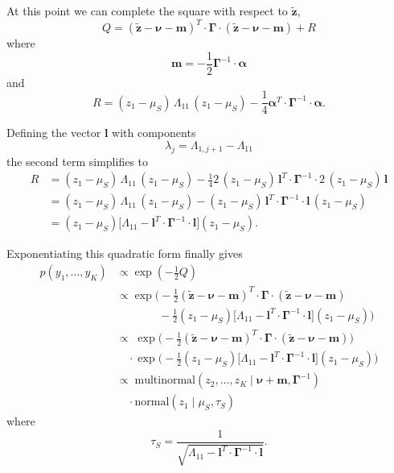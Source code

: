 \documentclass[
  letterpaper,
  DIV=11,
  numbers=noendperiod]{scrartcl}
\begin{document}
At this point we can complete the square with respect to
\(\mathbf{\tilde{z}}\), \[
Q =
(\mathbf{\tilde{z}} - \boldsymbol{\nu} - \mathbf{m})^{T} \cdot
\boldsymbol{\Gamma} \cdot
(\mathbf{\tilde{z}} - \boldsymbol{\nu} - \mathbf{m})
+ R
\] where \[
\mathbf{m} = - \frac{1}{2} \boldsymbol{\Gamma}^{-1} \cdot \boldsymbol{\alpha}
\] and \[
R =
(z_{1} - \mu_{S}) \, \Lambda_{11} \, (z_{1} - \mu_{S})
- \frac{1}{4} \boldsymbol{\alpha}^{T} \cdot
              \boldsymbol{\Gamma}^{-1} \cdot
              \boldsymbol{\alpha}.
\]

Defining the vector \(\mathbf{l}\) with components \[
\lambda_{j} = \Lambda_{1,j+1} - \Lambda_{11}
\] the second term simplifies to \begin{align*}
R
&=
(z_{1} - \mu_{S}) \, \Lambda_{11} \, (z_{1} - \mu_{S})
- \frac{1}{4} 2 \, (z_{1} - \mu_{S}) \, \mathbf{l}^{T} \cdot
  \boldsymbol{\Gamma}^{-1} \cdot
  2 \, (z_{1} - \mu_{S}) \, \mathbf{l}
\\
&=
(z_{1} - \mu_{S}) \, \Lambda_{11} \, (z_{1} - \mu_{S})
- (z_{1} - \mu_{S}) \, \mathbf{l}^{T} \cdot
  \boldsymbol{\Gamma}^{-1} \cdot
  \mathbf{l} \, (z_{1} - \mu_{S})
\\
&=
(z_{1} - \mu_{S})
\bigg[ \Lambda_{11} - \mathbf{l}^{T} \cdot
                      \boldsymbol{\Gamma}^{-1} \cdot
                      \mathbf{l} \bigg]
(z_{1} - \mu_{S}).
\end{align*}

Exponentiating this quadratic form finally gives \begin{align*}
p(y_{1}, \ldots, y_{K})
&\propto
\exp \left( -\frac{1}{2} Q \right)
\\
&\propto
\exp \bigg( -\frac{1}{2}
(\mathbf{\tilde{z}} - \boldsymbol{\nu} - \mathbf{m})^{T} \cdot
\boldsymbol{\Gamma} \cdot
(\mathbf{\tilde{z}} - \boldsymbol{\nu} - \mathbf{m})
\\
&\quad\quad\quad\;\;\, -\frac{1}{2}
(z_{1} - \mu_{S})
\bigg[ \Lambda_{11} - \mathbf{l}^{T} \cdot
                      \boldsymbol{\Gamma}^{-1} \cdot
                      \mathbf{l} \bigg]
(z_{1} - \mu_{S}) \bigg)
\\
&\propto \;
\exp \bigg( -\frac{1}{2}
(\mathbf{\tilde{z}} - \boldsymbol{\nu} - \mathbf{m})^{T} \cdot
\boldsymbol{\Gamma} \cdot
(\mathbf{\tilde{z}} - \boldsymbol{\nu} - \mathbf{m}) \bigg)
\\
&\quad \cdot \exp \bigg( -\frac{1}{2}
(z_{1} - \mu_{S})
\bigg[ \Lambda_{11} - \mathbf{l}^{T} \cdot
                      \boldsymbol{\Gamma}^{-1} \cdot
                      \mathbf{l} \bigg]
(z_{1} - \mu_{S}) \bigg)
\\
&\propto \;
\text{multinormal} \left( z_{2}, \ldots, z_{K} \mid
                          \boldsymbol{\nu} + \mathbf{m},
                          \boldsymbol{\Gamma}^{-1} \right)
\\
& \quad \cdot
\text{normal} \left( z_{1} \mid \mu_{S}, \tau_{S}  \right)
\end{align*} where \[
\tau_{S} = \frac{1}{\sqrt{  \Lambda_{11}
                          - \mathbf{l}^{T} \cdot
                            \boldsymbol{\Gamma}^{-1} \cdot
                            \mathbf{l} } }.
\]
\end{document}
